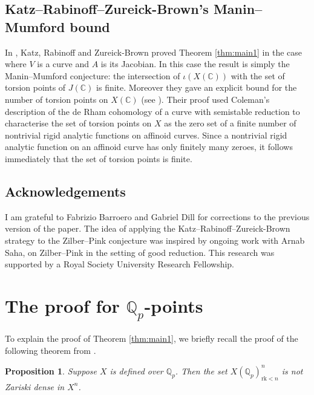 \documentclass{amsart}
\def\Q{\mathbb Q}
\def\C{\mathbb C}
\newcommand{\rk}{\mathrm{rk}}
\theoremstyle{plain}
\newtheorem{proposition}{Proposition}
\theoremstyle{definition}
\begin{document}
\subsection{Katz--Rabinoff--Zureick-Brown's Manin--Mumford bound}
In \cite{KRB}, Katz, Rabinoff and Zureick-Brown proved Theorem \ref{thm:main1} in the case where $V$ is a curve and $A$ is its Jacobian. In this case the result is simply the Manin--Mumford conjecture: the intersection of $\iota (X(\mathbb{C}))$ with the set of torsion points of $J(\C )$ is finite. Moreover they gave an explicit bound for the number of torsion points on $X(\mathbb{C})$ (see \cite[Theorem 1.2 and 1.3]{KRB}). Their proof used Coleman's description of the de Rham cohomology of a curve with semistable reduction \cite{CI99} \cite{CI10} to characterise the set of torsion points on $X$ as the zero set of a finite number of nontrivial rigid analytic functions on affinoid curves. Since a nontrivial rigid analytic function on an affinoid curve has only finitely many zeroes, it follows immediately that the set of torsion points is finite.

\subsection*{Acknowledgements}
I am grateful to Fabrizio Barroero and Gabriel Dill for corrections to the previous version of the paper. The idea of applying the Katz--Rabinoff--Zureick-Brown strategy to the Zilber--Pink conjecture was inspired by ongoing work with Arnab Saha, on Zilber--Pink in the setting of good reduction. This research was supported by a Royal Society University Research Fellowship. 
\section{The proof for $\Q _p $-points}
To explain the proof of Theorem \ref{thm:main1}, we briefly recall the proof of the following theorem from \cite{dogra}.
\begin{proposition}\label{prop:old}
Suppose $X$ is defined over $\Q _p $. Then the set $X(\Q _p )^n _{\rk <n}$ is not Zariski dense in $X^n$.
\end{proposition}
\end{document}

